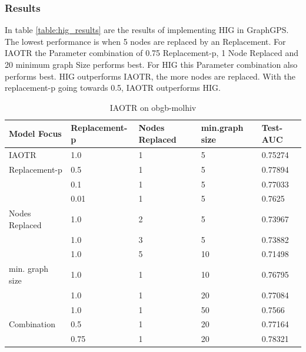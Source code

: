 \subsubsection{Results}
In table \ref{table:hig_results} are the results of implementing HIG in GraphGPS. The lowest performance is when 5 nodes are replaced by an Replacement. For IAOTR the Parameter combination of 0.75 Replacement-p, 1 Node Replaced and 20 minimum graph Size performs best. For HIG  this Parameter combination also performs best. HIG outperforms IAOTR, the more nodes are replaced. With the replacement-p going towards 0.5, IAOTR outperforms HIG.
\begin{table}[ht!]
    \centering
    \begin{tabular}{@{}lllll@{}}
        \toprule
        Model Focus     & Replacement-p     & Nodes Replaced    & min.graph size & Test-AUC \\ \midrule
        IAOTR           & 1.0               & 1                 & 5              & 0.75274  \\
        Replacement-p   & 0.5               & 1                 & 5              & 0.77894  \\
                        & 0.1               & 1                 & 5              & 0.77033  \\
                        & 0.01              & 1                 & 5              & 0.7625   \\
        Nodes Replaced  & 1.0               & 2                 & 5              & 0.73967  \\
                        & 1.0               & 3                 & 5              & 0.73882  \\
                        & 1.0               & 5                 & 10             & 0.71498  \\
        min. graph size & 1.0               & 1                 & 10             & 0.76795  \\
                        & 1.0               & 1                 & 20             & 0.77084  \\
                        & 1.0               & 1                 & 50             & 0.7566   \\
        Combination     & 0.5               & 1                 & 20             & 0.77164  \\
                        & 0.75              & 1                 & 20             & 0.78321  \\ \bottomrule
    \end{tabular}
    \caption{IAOTR on obgb-molhiv}
    \label{table:loss_results}
\end{table}

